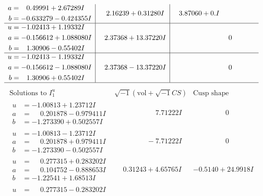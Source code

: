 \documentclass[1p]{elsarticle_modified}
\theoremstyle{definition}
\newcommand{\I}{\sqrt{-1}}
\begin{document}
$$\begin{array}{c|c|c}
\begin{aligned}
a &= \phantom{-}0.49991 + 2.67289 I \\
b &= -0.633279 - 0.424355 I\end{aligned}
 & \phantom{-}2.16239 + 0.31280 I & \phantom{-}3.87060 + 0. I\phantom{ +0.000000I} \\ \hline\begin{aligned}
u &= -1.02413 + 1.19332 I \\
a &= -0.156612 + 1.088080 I \\
b &= \phantom{-}1.30906 - 0.55402 I\end{aligned}
 & \phantom{-}2.37368 + 13.37220 I & \phantom{-0.000000 } 0 \\ \hline\begin{aligned}
u &= -1.02413 - 1.19332 I \\
a &= -0.156612 - 1.088080 I \\
b &= \phantom{-}1.30906 + 0.55402 I\end{aligned}
 & \phantom{-}2.37368 - 13.37220 I & \phantom{-0.000000 } 0\\
 \hline 
 \end{array}$$\newpage$$\begin{array}{c|c|c}  
\text{Solutions to }I^u_{1}& \I (\text{vol} + \sqrt{-1}CS) & \text{Cusp shape}\\
 \hline 
\begin{aligned}
u &= -1.00813 + 1.23712 I \\
a &= \phantom{-}0.201878 - 0.979411 I \\
b &= -1.273390 + 0.502557 I\end{aligned}
 & \phantom{-0.000000 -}7.71222 I & \phantom{-0.000000 } 0 \\ \hline\begin{aligned}
u &= -1.00813 - 1.23712 I \\
a &= \phantom{-}0.201878 + 0.979411 I \\
b &= -1.273390 - 0.502557 I\end{aligned}
 & \phantom{-0.000000 } -7.71222 I & \phantom{-0.000000 } 0 \\ \hline\begin{aligned}
u &= \phantom{-}0.277315 + 0.283202 I \\
a &= \phantom{-}0.104752 - 0.888653 I \\
b &= -1.22541 + 1.68513 I\end{aligned}
 & \phantom{-}0.31243 + 4.65765 I & -0.5140 + 24.9918 I \\ \hline\begin{aligned}
u &= \phantom{-}0.277315 - 0.283202 I \\

\end{aligned}
\end{array}$$
\end{document}
